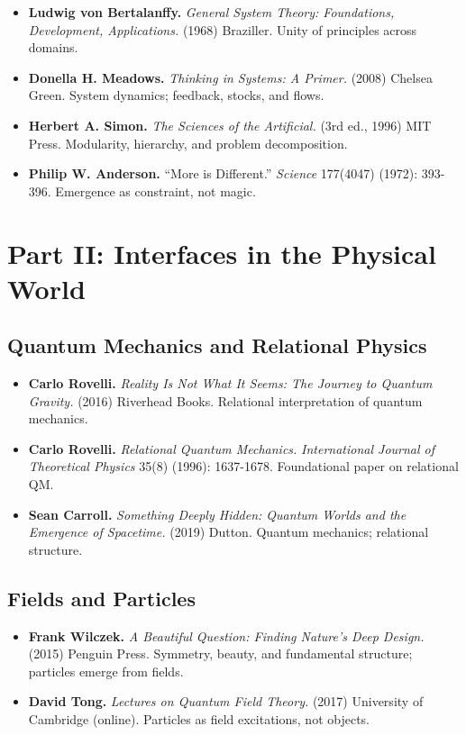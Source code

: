 \documentclass[
  openright]{book}
\begin{document}
\begin{itemize}
\item
  \textbf{Ludwig von Bertalanffy.} \emph{General System Theory:
  Foundations, Development, Applications.} (1968) Braziller. Unity of
  principles across domains.
\item
  \textbf{Donella H. Meadows.} \emph{Thinking in Systems: A Primer.}
  (2008) Chelsea Green. System dynamics; feedback, stocks, and flows.
\item
  \textbf{Herbert A. Simon.} \emph{The Sciences of the Artificial.} (3rd
  ed., 1996) MIT Press. Modularity, hierarchy, and problem
  decomposition.
\item
  \textbf{Philip W. Anderson.} ``More is Different.'' \emph{Science}
  177(4047) (1972): 393-396. Emergence as constraint, not magic.
\end{itemize}

\section{Part II: Interfaces in the Physical
World}\label{part-ii-interfaces-in-the-physical-world}

\subsection{Quantum Mechanics and Relational
Physics}\label{quantum-mechanics-and-relational-physics}

\begin{itemize}
\item
  \textbf{Carlo Rovelli.} \emph{Reality Is Not What It Seems: The
  Journey to Quantum Gravity.} (2016) Riverhead Books. Relational
  interpretation of quantum mechanics.
\item
  \textbf{Carlo Rovelli.} \emph{Relational Quantum Mechanics.}
  \emph{International Journal of Theoretical Physics} 35(8) (1996):
  1637-1678. Foundational paper on relational QM.
\item
  \textbf{Sean Carroll.} \emph{Something Deeply Hidden: Quantum Worlds
  and the Emergence of Spacetime.} (2019) Dutton. Quantum mechanics;
  relational structure.
\end{itemize}

\subsection{Fields and Particles}\label{fields-and-particles}

\begin{itemize}
\item
  \textbf{Frank Wilczek.} \emph{A Beautiful Question: Finding Nature's
  Deep Design.} (2015) Penguin Press. Symmetry, beauty, and fundamental
  structure; particles emerge from fields.
\item
  \textbf{David Tong.} \emph{Lectures on Quantum Field Theory.} (2017)
  University of Cambridge (online). Particles as field excitations, not
  objects.
\end{itemize}
\end{document}
